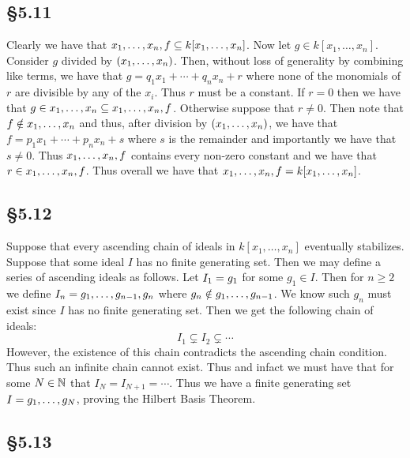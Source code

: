\documentclass[letterpaper]{article}
\begin{document}
\subsection*{\S 5.11}

Clearly we have that $\gen{x_{1}, \ldots, x_{n}, f} \subseteq k[x_{1}, \ldots, x_{n}]$. Now let $g \in k[x_{1}, \ldots, x_{n}]$. Consider $g$ divided by $\pqty{x_{1}, \ldots, x_{n}}$. Then, without loss of generality by combining like terms, we have that $g = q_{1}x_{1} + \cdots + q_{n}x_{n} + r$ where none of the monomials of $r$ are divisible by any of the $x_{i}$. Thus $r$ must be a constant. If $r = 0$ then we have that $g \in \gen{x_{1}, \ldots, x_{n}} \subseteq \gen{x_{1}, \ldots, x_{n}, f}$. Otherwise suppose that $r \neq 0$. Then note that $f \notin \gen{x_{1}, \ldots, x_{n}}$ and thus, after division by $\pqty{x_{1}, \ldots, x_{n}}$, we have that $f = p_{1}x_{1} + \cdots + p_{n}x_{n} + s$ where $s$ is the remainder and importantly we have that $s \neq 0$. Thus $\gen{x_{1}, \ldots, x_{n}, f}$ contains every non-zero constant and we have that $r \in \gen{x_{1}, \ldots, x_{n}, f}$. Thus overall we have that $\gen{x_{1}, \ldots, x_{n}, f} = k[x_{1}, \ldots, x_{n}]$.

\subsection*{\S 5.12}

Suppose that every ascending chain of ideals in $k[x_{1}, \ldots, x_{n}]$ eventually stabilizes. Suppose that some ideal $I$ has no finite generating set. Then we may define a series of ascending ideals as follows. Let $I_{1} = \gen{g_{1}}$ for some $g_{1} \in I$. Then for $n \geq 2$ we define $I_{n} = \gen{g_{1}, \ldots, g_{n - 1}, g_{n}}$ where $g_{n} \notin \gen{g_{1}, \ldots, g_{n - 1}}$. We know such $g_{n}$ must exist since $I$ has no finite generating set. Then we get the following chain of ideals:
\[
  I_{1} \subsetneq I_{2} \subsetneq \cdots
\]
However, the existence of this chain contradicts the ascending chain condition. Thus such an infinite chain cannot exist. Thus and infact we must have that for some $N \in \mathbb{N}$ that $I_{N} = I_{N + 1} = \cdots$. Thus we have a finite generating set $I = \gen{g_{1}, \ldots, g_{N}}$, proving the Hilbert Basis Theorem.

\subsection*{\S 5.13}
\end{document}

